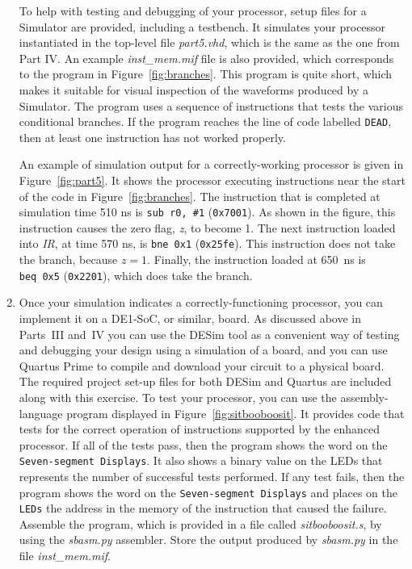 \documentclass[epsfig,10pt,fullpage]{article} \addtolength{\textwidth}{1.5in}
\newcommand{\red}[1]{{\color{red}\sf{#1}}}
\begin{document}
\begin{enumerate}
To help with testing and debugging of your processor, setup files for a Simulator are
provided, including a testbench. It simulates your processor instantiated in the top-level file
{\it part5.vhd}, which is the same as the one from Part IV. 
An example {\it inst\_mem.mif} file is also provided, which corresponds 
to the program in Figure~\ref{fig:branches}. This program is quite short, 
which makes it suitable for visual inspection of the waveforms produced by a Simulator. 
The program uses a sequence of instructions that tests the various conditional branches. 
If the program reaches the line of code labelled \texttt{DEAD}, then at least one 
instruction has not worked properly. 

An example of simulation output for a correctly-working
processor is given in Figure~\ref{fig:part5}. It shows the processor executing instructions
near the start of the code in Figure~\ref{fig:branches}. The instruction that is completed
at simulation time 510 ns is \texttt{sub r0, \#1} (\texttt{0x7001}). As shown in the figure,
this instruction causes the zero flag, {\it z}, to become 1. The next instruction loaded
into {\it IR}, at time 570 ns, is \texttt{bne 0x1} (\texttt{0x25fe}). This instruction
does not take the branch, because $z = 1$. Finally, the instruction loaded at 650~ns is 
\texttt{beq~0x5} (\texttt{0x2201}), which does take the branch. 

\item Once your simulation indicates a correctly-functioning processor,
you can implement it on a DE1-SoC, or similar, board. As discussed above in Parts~III and~IV
you can use the DESim tool as a convenient way of testing and debugging your design 
using a simulation of a board, and you can use Quartus Prime to compile and download your 
circuit to a physical board.  The required project set-up files for both DESim and Quartus are
included along with this exercise.  To test your processor, 
you can use the assembly-language program displayed in Figure~\ref{fig:sitbooboosit}. It 
provides code that tests for the correct operation of instructions supported by the 
enhanced processor.  If all of the tests pass, then
the program shows the word \texttt{\red{PASSEd}} on the
\texttt{Seven-segment Displays}. It also shows 
a binary value on the LEDs that represents the number of successful tests performed. If any test
fails, then the program shows the word \texttt{\red{FAILEd}} on the
\texttt{Seven-segment Displays} and 
places on the \texttt{LEDs} the address in the memory of the instruction that caused the failure.
Assemble the program, which is provided in a file called {\it sitbooboosit.s}, by using 
the {\it sbasm.py} assembler. Store the output produced by {\it sbasm.py} in the file
{\it inst\_mem.mif}.


\end{enumerate}
\end{document}

